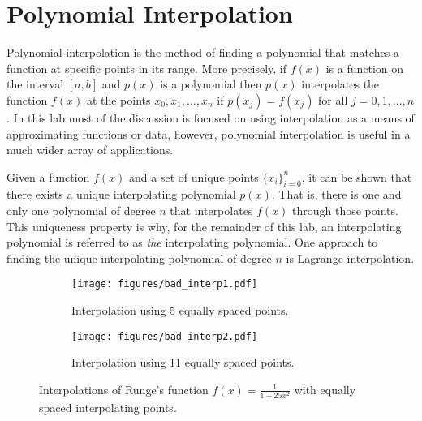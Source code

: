 \label{lab:Polynomial Interpolation}
\labdependencies{}

\section*{Polynomial Interpolation}
Polynomial interpolation is the method of finding a polynomial that matches a function at specific points in its range.
More precisely, if $f(x)$ is a function on the interval $[a,b]$ and $p(x)$ is a polynomial then $p(x)$ interpolates the function $f(x)$ at the points $x_0,x_1,\dots ,x_n$ if $p(x_j)=f(x_j)$ for all $j=0,1,\dots,n$.
In this lab most of the discussion is focused on using interpolation as a means of approximating functions or data, however, polynomial interpolation is useful in a much wider array of applications.

Given a function $f(x)$ and a set of unique points $\{x_i\}_{i=0}^n$, it can be shown that there exists a unique interpolating polynomial $p(x)$.
That is, there is one and only one polynomial of degree $n$ that interpolates $f(x)$ through those points.
This uniqueness property is why, for the remainder of this lab, an interpolating polynomial is referred to as \emph{the} interpolating polynomial.
One approach to finding the unique interpolating polynomial of degree $n$ is Lagrange interpolation.

\begin{figure}
\captionsetup[subfigure]{justification=centering}
\captionsetup{justification=centering}
\centering
\begin{subfigure}{.5\textwidth}
    \centering
    \texttt{[image: figures/bad\_interp1.pdf]}
    \caption{Interpolation using 5 equally spaced points.}
    \label{fig:bad1}
\end{subfigure}%
\begin{subfigure}{.5\textwidth}
    \centering
    \texttt{[image: figures/bad\_interp2.pdf]}
    \caption{Interpolation using 11 equally spaced points.}
    \label{fig:bad2}
\end{subfigure}
\caption{Interpolations of Runge's function $f(x)=\frac{1}{1+25x^2}$ with equally spaced interpolating points.}
\label{fig:badinterp}
\end{figure}

